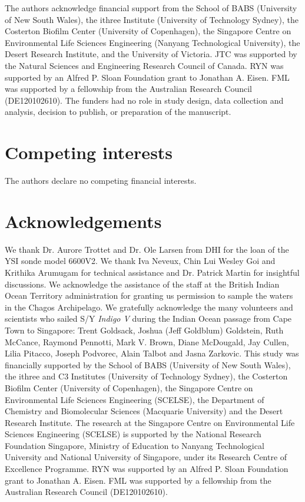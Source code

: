 \begin{refsection}
The authors acknowledge financial support from the School of BABS (University of New South Wales), the ithree Institute (University of Technology Sydney), the Costerton Biofilm Center (University of Copenhagen), the Singapore Centre on Environmental Life Sciences Engineering (Nanyang Technological University), the Desert Research Institute, and the University of Victoria. JTC was supported by the Natural Sciences and Engineering Research Council of Canada. RYN was supported by an Alfred P. Sloan Foundation grant to Jonathan A. Eisen. FML was supported by a fellowship from the Australian Research Council (DE120102610). The funders had no role in study design, data collection and analysis, decision to publish, or preparation of the manuscript.

\section{Competing interests}

The authors declare no competing financial interests.

\section{Acknowledgements}

We thank Dr. Aurore Trottet and Dr. Ole Larsen from DHI for the loan of the YSI sonde model 6600V2. We thank Iva Neveux, Chin Lui Wesley Goi and Krithika Arumugam for technical assistance and Dr. Patrick Martin for insightful discussions. We acknowledge the assistance of the staff at the British Indian Ocean Territory administration for granting us permission to sample the waters in the Chagos Archipelago. We gratefully acknowledge the many volunteers and scientists who sailed S/Y {\em Indigo V} during the Indian Ocean passage from Cape Town to Singapore: Trent Goldsack, Joshua (Jeff Goldblum) Goldstein, Ruth McCance, Raymond Pennotti, Mark V. Brown, Diane McDougald, Jay Cullen, Lilia Pitacco, Joseph Podvorec, Alain Talbot and Jasna Zarkovic. This study was financially supported by the School of BABS (University of New South Wales), the ithree and C3 Institutes (University of Technology Sydney), the Costerton Biofilm Center (University of Copenhagen), the Singapore Centre on Environmental Life Sciences Engineering (SCELSE), the Department of Chemistry and Biomolecular Sciences (Macquarie University) and the Desert Research Institute. The research at the Singapore Centre on Environmental Life Sciences Engineering (SCELSE) is supported by the National Research Foundation Singapore, Ministry of Education to Nanyang Technological University and National University of Singapore, under its Research Centre of Excellence Programme. RYN was supported by an Alfred P. Sloan Foundation grant to Jonathan A. Eisen. FML was supported by a fellowship from the Australian Research Council (DE120102610).


\end{refsection}
